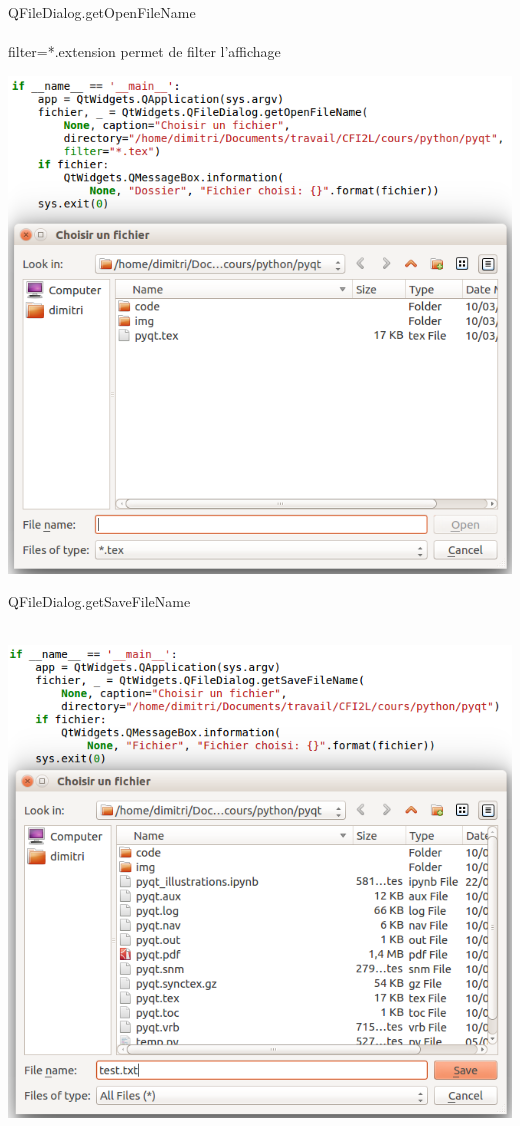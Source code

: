 \documentclass[9pt, french, brown]{beamer}
\newcommand{\mytitle}[1]{{\color{brown}#1 \\~\\}}
\begin{document}
\begin{frame}{\secname}{\subsecname{}}
\mytitle{QFileDialog.getOpenFileName}
{\footnotesize filter=*.extension permet de filter l\rq{}affichage}
\begin{center}\includegraphics[scale=0.3]{img/filedialog2}\end{center}
\end{frame}

\begin{frame}{\secname}{\subsecname{}}
\mytitle{QFileDialog.getSaveFileName}
\begin{center}\includegraphics[scale=0.3]{img/filedialog3}\end{center}
\end{frame}
\end{document}
